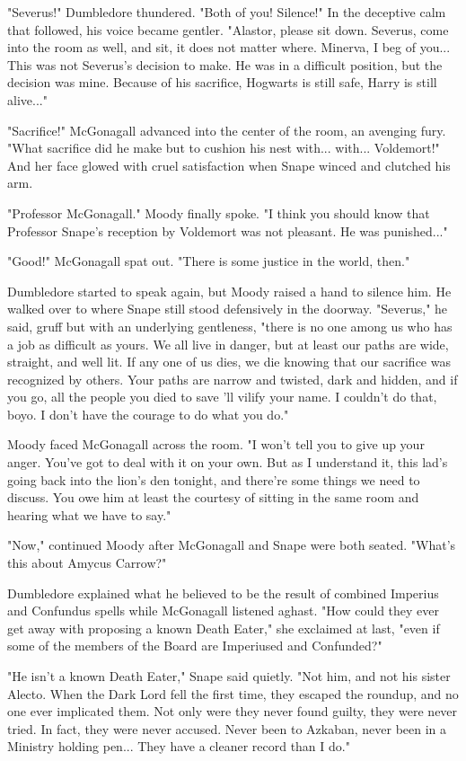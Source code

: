 \documentclass[a4paper,11pt]{article}
\begin{document}
"Severus!" Dumbledore thundered. "Both of you! Silence!" In the deceptive calm that followed, his voice became gentler. "Alastor, please sit down. Severus, come into the room as well, and sit, it does not matter where. Minerva, I beg of you... This was not Severus's decision to make. He was in a difficult position, but the decision was mine. Because of his sacrifice, Hogwarts is still safe, Harry is still alive..."

"Sacrifice!" McGonagall advanced into the center of the room, an avenging fury. "What sacrifice did he make but to cushion his nest with... with... Voldemort!" And her face glowed with cruel satisfaction when Snape winced and clutched his arm.

"Professor McGonagall." Moody finally spoke. "I think you should know that Professor Snape's reception by Voldemort was not pleasant. He was punished..."

"Good!" McGonagall spat out. "There is some justice in the world, then."

Dumbledore started to speak again, but Moody raised a hand to silence him. He walked over to where Snape still stood defensively in the doorway. "Severus," he said, gruff but with an underlying gentleness, "there is no one among us who has a job as difficult as yours. We all live in danger, but at least our paths are wide, straight, and well lit. If any one of us dies, we die knowing that our sacrifice was recognized by others. Your paths are narrow and twisted, dark and hidden, and if you go, all the people you died to save 'll vilify your name. I couldn't do that, boyo. I don't have the courage to do what you do."

Moody faced McGonagall across the room. "I won't tell you to give up your anger. You've got to deal with it on your own. But as I understand it, this lad's going back into the lion's den tonight, and there're some things we need to discuss. You owe him at least the courtesy of sitting in the same room and hearing what we have to say."

"Now," continued Moody after McGonagall and Snape were both seated. "What's this about Amycus Carrow?"

Dumbledore explained what he believed to be the result of combined Imperius and Confundus spells while McGonagall listened aghast. "How could they ever get away with proposing a known Death Eater," she exclaimed at last, "even if some of the members of the Board are Imperiused and Confunded?"

"He isn't a known Death Eater," Snape said quietly. "Not him, and not his sister Alecto. When the Dark Lord fell the first time, they escaped the roundup, and no one ever implicated them. Not only were they never found guilty, they were never tried. In fact, they were never accused. Never been to Azkaban, never been in a Ministry holding pen... They have a cleaner record than I do."
\end{document}
